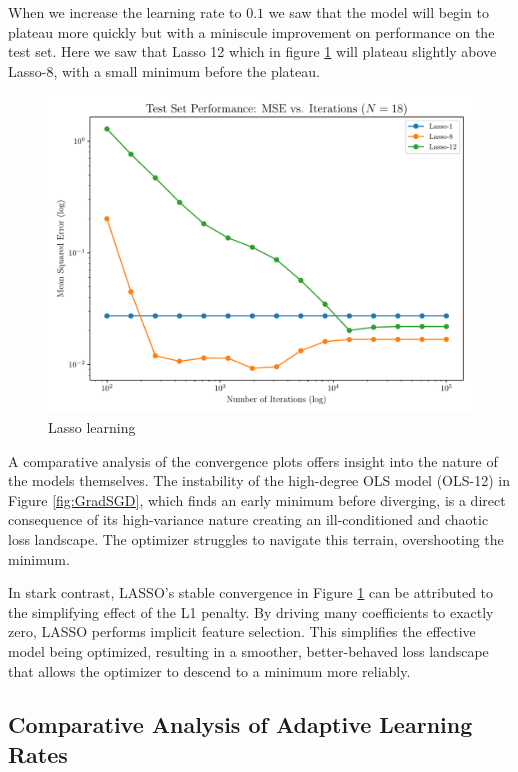 \documentclass[twocolumn,aps]{revtex4}
\begin{document}
When we increase the learning rate to $0.1$ we saw that the model will begin to plateau more quickly but with a miniscule improvement on performance on the test set. 
Here we saw that Lasso 12 which in figure \ref{fig:Lasso1} will plateau slightly above Lasso-8, with a small minimum before the plateau.


\begin{figure}[h]
    \centering
    \includegraphics[width=.95 \linewidth]{Figures/Lasso_MSE.pdf}
    \caption{Lasso learning}
    \label{fig:Lasso1}
\end{figure}

A comparative analysis of the convergence plots offers insight into the nature of the models themselves. The instability of the high-degree OLS model (OLS-12) in Figure \ref{fig:GradSGD}, which finds an early minimum before diverging, is a direct consequence of its high-variance nature creating an ill-conditioned and chaotic loss landscape. 
The optimizer struggles to navigate this terrain, overshooting the minimum.

In stark contrast, LASSO's stable convergence in Figure \ref{fig:Lasso1} can be attributed to the simplifying effect of the L1 penalty. By driving many coefficients to exactly zero, LASSO performs implicit feature selection. 
This simplifies the effective model being optimized, resulting in a smoother, better-behaved loss landscape that allows the optimizer to descend to a minimum more reliably.

\subsection{Comparative Analysis of Adaptive Learning Rates}
\end{document}
